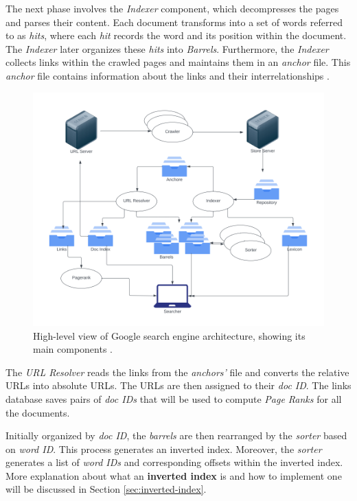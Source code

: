 The next phase involves the \textit{Indexer} component, which decompresses the pages and parses their content. Each document transforms into a set of words referred to as \textit{hits}, where each \textit{hit} records the word and its position within the document. The \textit{Indexer} later organizes these \textit{hits} into \textit{Barrels}. Furthermore, the \textit{Indexer} collects links within the crawled pages and maintains them in an \textit{anchor} file. This \textit{anchor} file contains information about the links and their interrelationships \cite{brin1998anatomy}.


\begin{figure}[h]	
     \centering
     \includegraphics[width=12cm]{figures/google_arch.png}
     \caption{High-level view of Google search engine architecture, showing its main components \cite{brin1998anatomy}.}
     \label{fig:google-arch}
\end{figure}

The \textit{URL Resolver} reads the links from the \textit{anchors'} file and converts the relative URLs into absolute URLs. The URLs are then assigned to their \textit{doc ID}. The links database saves pairs of \textit{doc IDs} that will be used to compute \textit{Page Ranks} for all the documents. 

Initially organized by \textit{doc ID}, the \textit{barrels} are then rearranged by the \textit{sorter} based on \textit{word ID}. This process generates an inverted index. Moreover, the \textit{sorter} generates a list of \textit{word IDs} and corresponding offsets within the inverted index. More explanation about what an \textbf{inverted index} is and how to implement one will be discussed in Section \ref{sec:inverted-index}.
